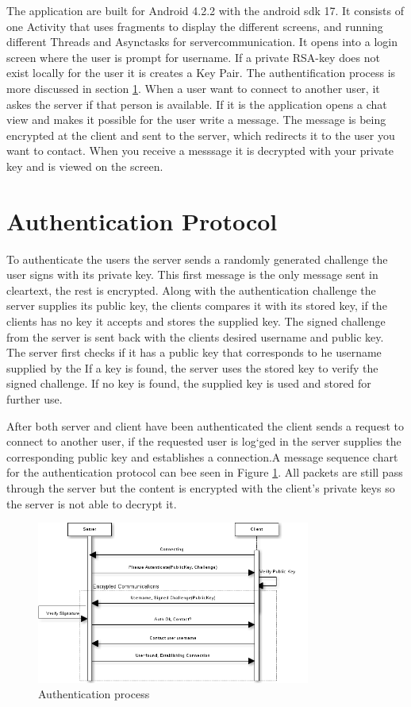 \documentclass[twocolumn,11pt]{IEEEtran}
\begin{document}
The application are built for Android 4.2.2 with the android sdk 17. It consists of one Activity that uses fragments to display the different screens, and running different Threads and Asynctasks for servercommunication. It opens into a login screen where the user is prompt for username. If a private RSA-key does not exist locally for the user it is creates a Key Pair. The authentification process is more discussed in section \ref{sec:auth}. When a user want to connect to another user, it askes the server if that person is available. If it is the application opens a chat view and makes it possible for the user write a message. The message is being encrypted at the client and sent to the server, which redirects it to the user you want to contact. When you receive a messsage it is decrypted with your private key and is viewed on the screen.



\section{Authentication Protocol}
\label{sec:auth}
To authenticate the users the server sends a randomly generated challenge the user signs with its private key. This first message is the only message sent in cleartext, the rest is encrypted. Along with the authentication challenge the server supplies its public key, the clients compares it with its stored key, if the clients has no key it accepts and stores the supplied key. The signed challenge from the server is sent back with the clients desired username and public key. The server first checks if it has a public key that corresponds to he username supplied by the  If a key is found, the server uses the stored key to verify the signed challenge. If no key is found, the supplied key is used and stored for further use.

After both server and client have been authenticated the client sends a request to connect to another user, if the requested user is log`ged in the server supplies the corresponding public key and establishes a connection.A message sequence chart for the authentication protocol can bee seen in Figure \ref{fig:auth}. All packets are still pass through the server but the content is encrypted with the client's private keys so the server is not able to decrypt it.
 

\begin{figure}
\label{fig:auth}
\centerline{
\includegraphics[width=90mm]{auth.png}}
\caption{Authentication process}
\end{figure}
\end{document}
